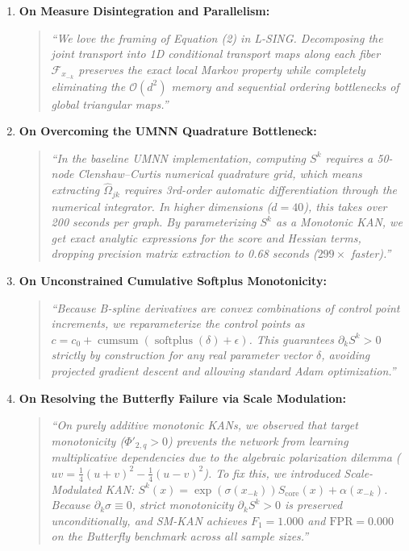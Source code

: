 \documentclass[11pt,a4paper]{article}
\theoremstyle{plain}
\theoremstyle{definition}
\theoremstyle{remark}
\begin{document}
\begin{enumerate}
    \item \textbf{On Measure Disintegration and Parallelism:}
    \begin{quote}
    \textit{``We love the framing of Equation (2) in L-SING. Decomposing the joint transport into 1D conditional transport maps along each fiber $\mathcal{F}_{x_{-k}}$ preserves the exact local Markov property while completely eliminating the $\mathcal{O}(d^2)$ memory and sequential ordering bottlenecks of global triangular maps.''}
    \end{quote}

    \item \textbf{On Overcoming the UMNN Quadrature Bottleneck:}
    \begin{quote}
    \textit{``In the baseline UMNN implementation, computing $S^k$ requires a 50-node Clenshaw--Curtis numerical quadrature grid, which means extracting $\widehat{\Omega}_{jk}$ requires 3rd-order automatic differentiation through the numerical integrator. In higher dimensions ($d=40$), this takes over 200 seconds per graph. By parameterizing $S^k$ as a Monotonic KAN, we get exact analytic expressions for the score and Hessian terms, dropping precision matrix extraction to 0.68 seconds ($299\times$ faster).''}
    \end{quote}

    \item \textbf{On Unconstrained Cumulative Softplus Monotonicity:}
    \begin{quote}
    \textit{``Because B-spline derivatives are convex combinations of control point increments, we reparameterize the control points as $c = c_0 + \operatorname{cumsum}(\operatorname{softplus}(\delta) + \epsilon)$. This guarantees $\partial_k S^k > 0$ strictly by construction for any real parameter vector $\delta$, avoiding projected gradient descent and allowing standard Adam optimization.''}
    \end{quote}

    \item \textbf{On Resolving the Butterfly Failure via Scale Modulation:}
    \begin{quote}
    \textit{``On purely additive monotonic KANs, we observed that target monotonicity ($\Phi'_{2, q} > 0$) prevents the network from learning multiplicative dependencies due to the algebraic polarization dilemma ($uv = \frac{1}{4}(u+v)^2 - \frac{1}{4}(u-v)^2$). To fix this, we introduced Scale-Modulated KAN: $S^k(x) = \exp(\sigma(x_{-k})) S_{\text{core}}(x) + \alpha(x_{-k})$. Because $\partial_k \sigma \equiv 0$, strict monotonicity $\partial_k S^k > 0$ is preserved unconditionally, and SM-KAN achieves $F_1 = 1.000$ and $\text{FPR} = 0.000$ on the Butterfly benchmark across all sample sizes.''}
    \end{quote}


\end{enumerate}
\end{document}
